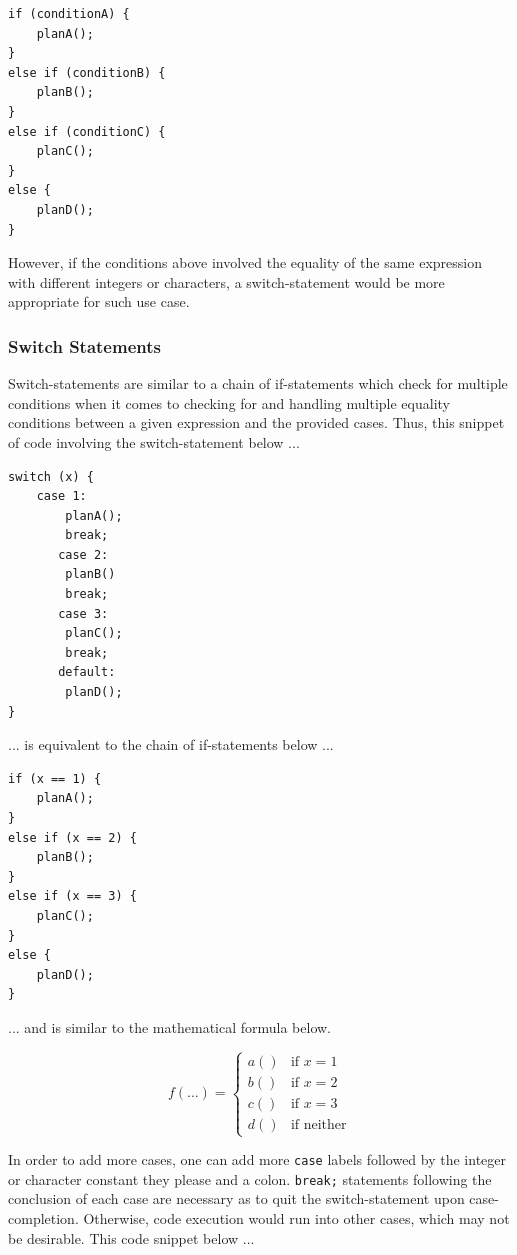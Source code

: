 \documentclass[12pt]{article}
\begin{document}
\begin{verbatim}
if (conditionA) {
    planA();
}
else if (conditionB) {
    planB();
}
else if (conditionC) {
    planC();
}
else {
    planD();
}
\end{verbatim}

However, if the conditions above involved the equality of the same expression with different integers or characters, a switch-statement would be more appropriate for such use case.

\subsubsection{Switch Statements}

Switch-statements are similar to a chain of if-statements which check for multiple conditions when it comes to checking for and handling multiple equality conditions between a given expression and the provided cases. Thus, this snippet of code involving the switch-statement below ...

\begin{verbatim}
switch (x) {
    case 1:
        planA();
        break;
       case 2:
        planB()
        break;
       case 3:
        planC();
        break;
       default:
        planD();
}
\end{verbatim}

... is equivalent to the chain of if-statements below ...

\begin{verbatim}
if (x == 1) {
    planA();
}
else if (x == 2) {
    planB();
}
else if (x == 3) {
    planC();
}
else {
    planD();
}
\end{verbatim}

... and is similar to the mathematical formula below.

$$f(...) = \begin{cases}
    a() & \text{if } x = 1 \\
    b() & \text{if } x = 2 \\
    c() & \text{if } x = 3 \\
    d() & \text{if neither}
\end{cases}$$

In order to add more cases, one can add more \texttt{case} labels followed by the integer or character constant they please and a colon. \texttt{break;} statements following the conclusion of each case are necessary as to quit the switch-statement upon case-completion. Otherwise, code execution would run into other cases, which may not be desirable. This code snippet below ...
\end{document}
